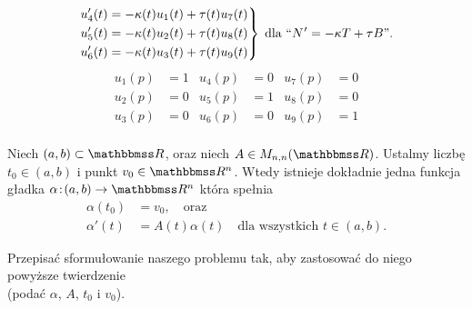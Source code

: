 \begin{frame}[<+->]
\begin{align*}
\end{align*}
\vspace*{-0.1in}
\pause\begin{equation*}
\left.\begin{aligned}      
u_4'(t)&=-\kappa(t)u_1(t)+\tau(t)u_7(t)\\
u_5'(t)&=-\kappa(t)u_2(t)+\tau(t)u_8(t)\\
u_6'(t)&=-\kappa(t)u_3(t)+\tau(t)u_9(t)
\end{aligned}\right\}\;\text{dla }``N\hspace{0.5pt}'=-\kappa T+\tau B\text{''}.
\end{equation*}
\vspace*{-0.2in}
\pause \begin{align*}
u_1(p)&=1 & u_4(p)&=0 & u_7(p)&=0\\ 
u_2(p)&=0 & u_5(p)&=1 & u_8(p)&=0\\
u_3(p)&=0 & u_6(p)&=0 & u_9(p)&=1\\ 
 \end{align*}

\end{frame}
\begin{frame}[<+->]
\begin{twierdzenie}\label{thm:dif-eq-solution}
Niech $(a,b)\subset \R$, oraz  niech $A\in M_{n,n}(\R)$.  Ustalmy liczbę $t_0\in (a,b)$ i punkt $v_0\in \R^n$. Wtedy istnieje dokładnie jedna funkcja gładka $\alpha\colon (a,b)\to \R^n$ która spełnia 
\begin{align*}
\alpha(t_0)&=v_0,\quad\text{oraz}\\
\alpha'(t)&=A(t)\alpha(t) \quad\text{dla wszystkich }t\in (a,b).
\end{align*}
\end{twierdzenie}

\begin{exercise}
Przepisać sformułowanie naszego problemu tak, aby zastosować do niego powyższe twierdzenie \\(podać $\alpha$, $A$, $t_0$ i $v_0$). 
\end{exercise}

\end{frame}
